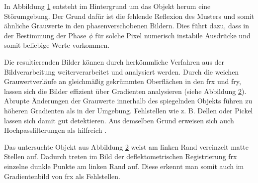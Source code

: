 {
	\begin{figure}[H]
		\centering
		
		\label{tikz:abbRegistrierungDelle}
	\end{figure}
}

\noindent
In Abbildung \ref{tikz:abbRegistrierungDelle} entsteht im Hintergrund um das Objekt herum eine Störumgebung.
Der Grund dafür ist die fehlende Reflexion des Musters und somit ähnliche Grauwerte in den phasenverschobenen Bildern.
Dies führt dazu, dass in der Bestimmung der Phase $\phi$ für solche Pixel numerisch instabile Ausdrücke und somit beliebige Werte vorkommen.

\p
Die resultierenden Bilder können durch herkömmliche Verfahren aus der Bildverarbeitung weiterverarbeitet und analysiert werden.
Durch die weichen Grauwertverläufe an gleichmäßig gekrümmten Oberflächen in den \acrshort{frx} und \acrshort{fry}, lassen sich die Bilder effizient über Gradienten analysieren (siehe Abbildung \ref{tikz:abbGradientenbildReg}).
Abrupte Änderungen der Grauwerte innerhalb des spiegelnden Objekts führen zu höheren Gradienten als in der Umgebung. Fehlstellen wie z. B. Dellen oder Pickel lassen sich damit gut detektieren.
Aus demselben Grund erweisen sich auch Hochpassfilterungen als hilfreich \cite{kit_werling}.

{
	\begin{figure}[H]
		\centering
		
		\label{tikz:abbGradientenbildReg}
	\end{figure}
}

\noindent
Das untersuchte Objekt aus Abbildung \ref{tikz:abbGradientenbildReg} weist am linken Rand vereinzelt matte Stellen auf.
Dadurch treten im Bild der deflektometrischen Registrierung \acrshort{frx} einzelne dunkle Punkte am linken Rand auf.
Diese erkennt man somit auch im Gradientenbild von \acrshort{frx} als Fehlstellen.


